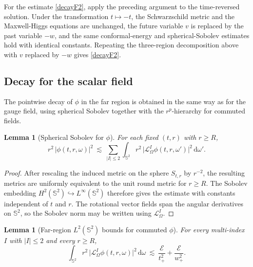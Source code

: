 \documentclass[11pt]{article}
\numberwithin{equation}{section}
\theoremstyle{plain}
\newtheorem{lemma}[theorem]{Lemma}
\theoremstyle{definition}
\theoremstyle{remark}
\newcommand{\dd}{\mathrm{d}}
\begin{document}
For the estimate \eqref{decayF2}, apply the preceding argument to the time-reversed solution.  Under the transformation \(t\mapsto -t\), the Schwarzschild metric and the Maxwell-Higgs equations are unchanged, the future variable \(v\) is replaced by the past variable \(-w\), and the same conformal-energy and spherical-Sobolev estimates hold with identical constants.  Repeating the three-region decomposition above with \(v\) replaced by \(-w\) gives \eqref{decayF2}.
\subsection{Decay for the scalar field}
\label{subsec:far-decay-phi}

The pointwise decay of $\phi$ in the far region is obtained in the same way as for the gauge field, using spherical Sobolev together with the $r^{p}$-hierarchy for commuted fields.

\begin{lemma}[Spherical Sobolev for $\phi$]\label{lem:sobolev-phi-sphere}
For each fixed $(t,r)$ with $r\ge R$,
\begin{equation}\label{scalarineq}
 r^{2}\,|\phi(t,r,\omega)|^{2}
 \ \lesssim\ \sum_{|I|\le 2}\int_{\mathbb S^{2}} r^{2}\,\bigl|\mathcal L_{\Omega}^{I}\phi(t,r,\omega')\bigr|^{2}\,\dd\omega'.
\end{equation}
\end{lemma}

\begin{proof}
After rescaling the induced metric on the sphere $S_{t,r}$ by $r^{-2}$, the resulting metrics are uniformly equivalent to the unit round metric for $r\ge R$.  The Sobolev embedding $H^2(\mathbb S^2)\hookrightarrow L^\infty(\mathbb S^2)$ therefore gives the estimate with constants independent of $t$ and $r$.  The rotational vector fields span the angular derivatives on $\mathbb S^2$, so the Sobolev norm may be written using $\mathcal L_\Omega^I$.
\end{proof}


\begin{lemma}[Far-region $L^{2}(\mathbb S^{2})$ bounds for commuted $\phi$]\label{lem:far-sphere-L2-phi}
For every multi-index $I$ with $|I|\le 2$ and every $r\ge R$,
\begin{equation}\label{eq:far-sphere-L2-phi}
\int_{\mathbb S^{2}} r^{2}\,\bigl|\mathcal L_{\Omega}^{I}\phi(t,r,\omega)\bigr|^{2}\,\dd\omega
\ \lesssim\ \frac{\mathcal E}{t_{+}^{2}}+\frac{\mathcal E}{w_{+}^{2}}.
\end{equation}
\end{lemma}
\end{document}
